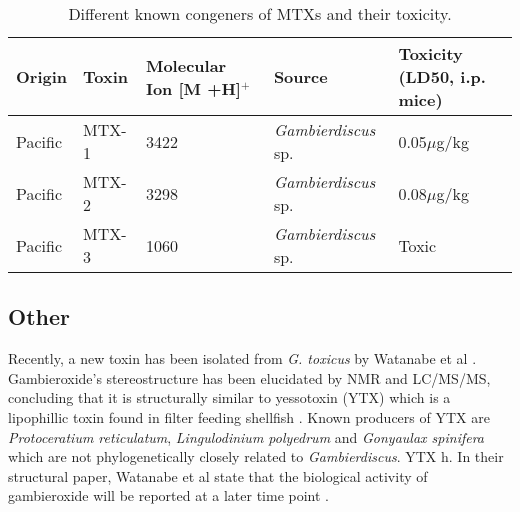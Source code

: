 \documentclass[12pt]{article}
\begin{document}

\begin{table}
\caption{Different known congeners of MTXs and their toxicity.}
\begin{tabular}{ |  p{2cm} | p{2cm} | p{3cm} | p{3cm} | p{4cm} | }
\hline
\textbf{Origin} & \textbf{Toxin} & \textbf{Molecular Ion [M +H]$^{+}$} & \textbf{Source} & \textbf{Toxicity (LD50, i.p. mice)} \\
\hline
 Pacific & MTX-1 & 3422 \citep{holmes1994purification,murata1993structure} & \emph{Gambierdiscus} sp. \citep{holmes1994purification} & 0.05$\mu$g/kg \citep{murata1993structure}\\
\hline
 Pacific & MTX-2 & 3298 \citep{holmes1994purification} & \emph{Gambierdiscus} sp. \citep{holmes1994purification} & 0.08$\mu$g/kg \citep{holmes1994purification}\\
\hline
 Pacific & MTX-3 & 1060   \citep{holmes1994purification} & \emph{Gambierdiscus} sp. \citep{holmes1994purification} & Toxic \citep{holmes1994purification} \\
\hline
\end{tabular}
\end{table}
\FloatBarrier

\subsection{Other}
Recently, a new toxin has been isolated from \emph{G. toxicus} by Watanabe et al \citep{watanabe2013gambieroxide}. Gambieroxide's stereostructure has been elucidated by NMR and LC/MS/MS, concluding that it is structurally similar to yessotoxin (YTX) which is a lipophillic toxin found in filter feeding shellfish  \citep{tubaro2010yessotoxins}. Known producers of YTX are \emph{Protoceratium reticulatum}, \emph{Lingulodinium polyedrum} and \emph{Gonyaulax spinifera} \citep{tubaro2010yessotoxins} which are not  phylogenetically closely related to \emph{Gambierdiscus}. YTX h. In their structural paper, Watanabe et al state that the biological activity of gambieroxide will be reported at a later time point \citep{watanabe2013gambieroxide}.

\newpage



\end{document}
